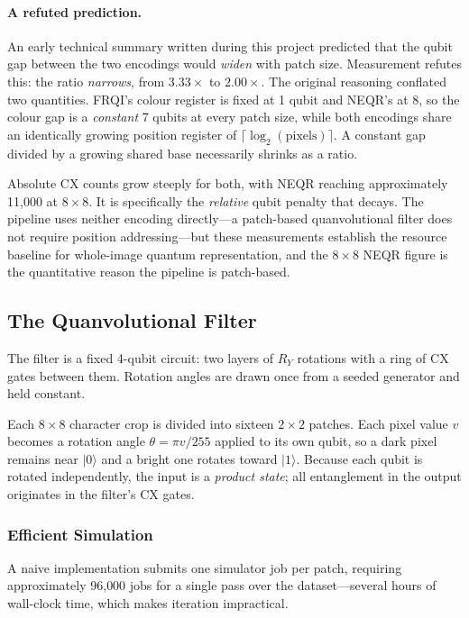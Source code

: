 \documentclass[11pt,a4paper]{article}
\begin{document}
\paragraph{A refuted prediction.} An early technical summary written during this
project predicted that the qubit gap between the two encodings would
\emph{widen} with patch size. Measurement refutes this: the ratio
\emph{narrows}, from $3.33\times$ to $2.00\times$. The original reasoning
conflated two quantities. FRQI's colour register is fixed at 1 qubit and NEQR's
at 8, so the colour gap is a \emph{constant} 7 qubits at every patch size, while
both encodings share an identically growing position register of
$\lceil\log_2(\text{pixels})\rceil$. A constant gap divided by a growing shared
base necessarily shrinks as a ratio.

Absolute CX counts grow steeply for both, with NEQR reaching approximately
11{,}000 at $8\times8$. It is specifically the \emph{relative} qubit penalty that
decays. The pipeline uses neither encoding directly---a patch-based
quanvolutional filter does not require position addressing---but these
measurements establish the resource baseline for whole-image quantum
representation, and the $8\times8$ NEQR figure is the quantitative reason the
pipeline is patch-based.

\subsection{The Quanvolutional Filter}

The filter is a fixed 4-qubit circuit: two layers of $R_Y$ rotations with a ring
of CX gates between them. Rotation angles are drawn once from a seeded generator
and held constant.

Each $8\times8$ character crop is divided into sixteen $2\times2$ patches. Each
pixel value $v$ becomes a rotation angle $\theta = \pi v/255$ applied to its own
qubit, so a dark pixel remains near $|0\rangle$ and a bright one rotates toward
$|1\rangle$. Because each qubit is rotated independently, the input is a
\emph{product state}; all entanglement in the output originates in the filter's
CX gates.

\subsubsection{Efficient Simulation}

A naive implementation submits one simulator job per patch, requiring
approximately 96{,}000 jobs for a single pass over the dataset---several hours of
wall-clock time, which makes iteration impractical.
\end{document}
